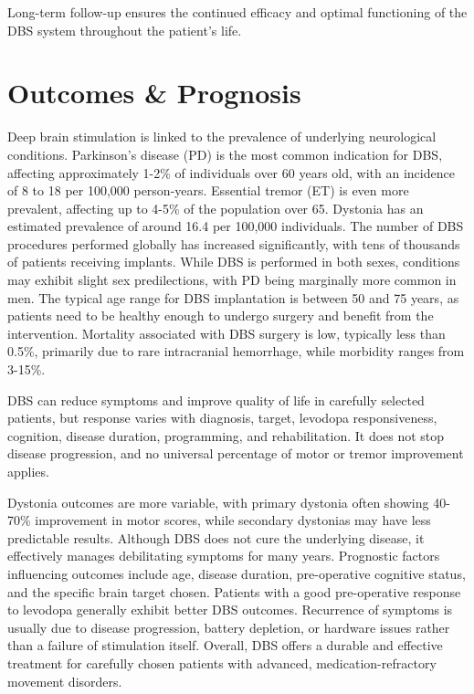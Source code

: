 Long-term follow-up ensures the continued efficacy and optimal functioning of the DBS system throughout the patient's life.

\section*{Outcomes \& Prognosis}
Deep brain stimulation is linked to the prevalence of underlying neurological conditions. Parkinson's disease (PD) is the most common indication for DBS, affecting approximately 1-2\% of individuals over 60 years old, with an incidence of 8 to 18 per 100,000 person-years. Essential tremor (ET) is even more prevalent, affecting up to 4-5\% of the population over 65. Dystonia has an estimated prevalence of around 16.4 per 100,000 individuals. The number of DBS procedures performed globally has increased significantly, with tens of thousands of patients receiving implants. While DBS is performed in both sexes, conditions may exhibit slight sex predilections, with PD being marginally more common in men. The typical age range for DBS implantation is between 50 and 75 years, as patients need to be healthy enough to undergo surgery and benefit from the intervention. Mortality associated with DBS surgery is low, typically less than 0.5\%, primarily due to rare intracranial hemorrhage, while morbidity ranges from 3-15\%.

DBS can reduce symptoms and improve quality of life in carefully selected patients, but response varies with diagnosis, target, levodopa responsiveness, cognition, disease duration, programming, and rehabilitation. It does not stop disease progression, and no universal percentage of motor or tremor improvement applies.

Dystonia outcomes are more variable, with primary dystonia often showing 40-70\% improvement in motor scores, while secondary dystonias may have less predictable results. Although DBS does not cure the underlying disease, it effectively manages debilitating symptoms for many years. Prognostic factors influencing outcomes include age, disease duration, pre-operative cognitive status, and the specific brain target chosen. Patients with a good pre-operative response to levodopa generally exhibit better DBS outcomes. Recurrence of symptoms is usually due to disease progression, battery depletion, or hardware issues rather than a failure of stimulation itself. Overall, DBS offers a durable and effective treatment for carefully chosen patients with advanced, medication-refractory movement disorders.

